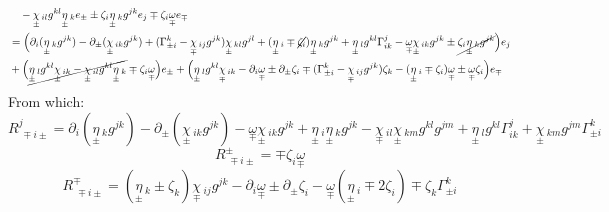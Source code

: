 \documentclass[a4paper,11pt]{article}
\numberwithin{equation}{section}
\theoremstyle{definition}
\begin{document}
\begin{align*}
    &\quad - \underset{\pm}{\chi}\,_{il}g^{kl}\underset{\pm}{\eta}\,_k e_\pm \pm \zeta_i\underset{\pm}{\eta}\,_kg^{jk} e_j \mp \zeta_i\underset{\mp}{\omega} e_\mp\\
    &=\Big(\partial_i (\underset{\pm}{\eta}\,_kg^{jk}) - \partial_\pm (\underset{\pm}{\chi}\,_{ik}g^{jk}) + (\Gamma_{\pm i}^k - \underset{\mp}{\chi}\,_{ij}g^{jk})\underset{\pm}{\chi}\,_{kl}g^{jl} +(\underset{\pm}{\eta}\,_i \mp \cancel{\zeta_i})\underset{\pm}{\eta}\,_kg^{jk} +\underset{\pm}{\eta}\,_lg^{kl} \Gamma_{i k}^j -\underset{\mp}{\omega} \underset{\pm}{\chi}\,_{ik}g^{jk} \pm \cancel{\zeta_i\underset{\pm}{\eta}\,_kg^{jk}} \Big)e_j\\
    &+\Big( \cancel{\underset{\pm}{\eta}\,_lg^{kl} \underset{\pm}{\chi}\,_{ik} - \underset{\pm}{\chi}\,_{il}g^{kl}\underset{\pm}{\eta}\,_k} \mp \zeta_i\underset{\mp}{\omega} \Big)e_\pm 
    +\Big(\underset{\pm}{\eta}\,_lg^{kl} \underset{\mp}{\chi}\,_{i k}-\partial_i \underset{\mp}{\omega} \pm \partial_\pm \zeta_i \mp (\Gamma_{\pm i}^k - \underset{\mp}{\chi}\,_{ij}g^{jk})\zeta_k-(\underset{\pm}{\eta}\,_i \mp \zeta_i)\underset{\mp}{\omega} \pm \underset{\mp}{\omega} \zeta_i \Big)e_\mp
\end{align*}
From which:
\begin{equation}
    \boxed{R^j_{\;\mp i\pm}=\partial_i (\underset{\pm}{\eta}\,_kg^{jk})
    \!-\! \partial_\pm (\underset{\pm}{\chi}\,_{ik}g^{jk})
    \!-\!\underset{\mp}{\omega} \underset{\pm}{\chi}\,_{ik}g^{jk}
    \!+\!\underset{\pm}{\eta}\,_i \underset{\pm}{\eta}\,_kg^{jk}
    \!\!-\! \underset{\mp}{\chi}\,_{il}\underset{\pm}{\chi}\,_{km}g^{kl}g^{jm}
    \!+\!\underset{\pm}{\eta}\,_lg^{kl} \Gamma_{i k}^j
    \!+\! \underset{\pm}{\chi}\,_{km}g^{jm}\Gamma_{\pm i}^k}
\end{equation}
\begin{equation}
    \boxed{R^\pm_{\;\mp i\pm}= \mp \zeta_i\underset{\mp}{\omega}}
\end{equation}
\begin{equation}
    \boxed{R^\mp_{\;\mp i\pm}=(\underset{\pm}{\eta}\,_k \pm \zeta_k )\underset{\mp}{\chi}\,_{i j}g^{jk}-\partial_i \underset{\mp}{\omega} \pm \partial_\pm \zeta_i -\underset{\mp}{\omega}(\underset{\pm}{\eta}\,_i \mp 2\zeta_i) \mp \zeta_k\Gamma_{\pm i}^k}
\end{equation}
\end{document}
